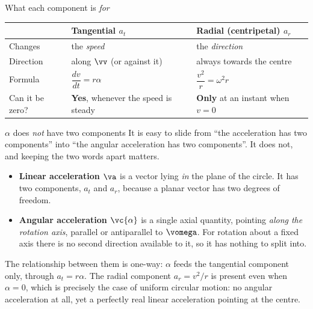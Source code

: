 \begin{tablebox}{What each component is \emph{for}}
\begin{center}
\begin{tabular}{@{}lll@{}}
\toprule
& \textbf{Tangential} $a_t$ & \textbf{Radial (centripetal)} $a_r$\\
\midrule
Changes & the \emph{speed} & the \emph{direction}\\
Direction & along $\vv$ (or against it) & always towards the centre\\
Formula & $\dfrac{dv}{dt}=r\alpha$ & $\dfrac{v^{2}}{r}=\omega^{2}r$\\
Can it be zero? & \textbf{Yes}, whenever the speed is steady & \textbf{Only} at an instant when $v=0$\\
\bottomrule
\end{tabular}
\end{center}
\end{tablebox}

\begin{trapbox}{$\alpha$ does \emph{not} have two components}
It is easy to slide from ``the acceleration has two components'' into ``the angular acceleration has
two components''. It does not, and keeping the two words apart matters.
\begin{itemize}
\item \textbf{Linear acceleration $\va$} is a vector lying \emph{in} the plane of the circle. It has
      two components, $a_t$ and $a_r$, because a planar vector has two degrees of freedom.
\item \textbf{Angular acceleration $\vc{\alpha}$} is a single axial quantity, pointing \emph{along the
      rotation axis}, parallel or antiparallel to $\vomega$. For rotation about a fixed axis there is
      no second direction available to it, so it has nothing to split into.
\end{itemize}
The relationship between them is one-way: $\alpha$ feeds the tangential component only, through
$a_t=r\alpha$. The radial component $a_r=v^{2}/r$ is present even when $\alpha=0$, which is precisely
the case of uniform circular motion: no angular acceleration at all, yet a perfectly real linear
acceleration pointing at the centre.
\end{trapbox}


